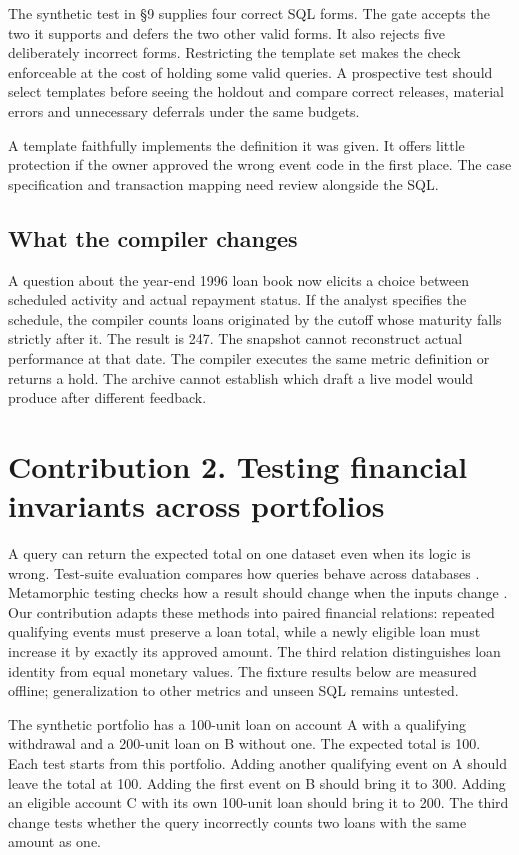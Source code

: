 \documentclass[11pt,a4paper,onecolumn,oneside]{rho-class/rho}
\begin{document}
The synthetic test in \S{}9 supplies four correct SQL forms. The gate accepts the two it supports and defers the two other valid forms. It also rejects five deliberately incorrect forms. Restricting the template set makes the check enforceable at the cost of holding some valid queries. A prospective test should select templates before seeing the holdout and compare correct releases, material errors and unnecessary deferrals under the same budgets.

A template faithfully implements the definition it was given. It offers little protection if the owner approved the wrong event code in the first place. The case specification and transaction mapping need review alongside the SQL.

\subsection{What the compiler changes}
A question about the year-end 1996 loan book now elicits a choice between scheduled activity and actual repayment status. If the analyst specifies the schedule, the compiler counts loans originated by the cutoff whose maturity falls strictly after it. The result is 247. The snapshot cannot reconstruct actual performance at that date. The compiler executes the same metric definition or returns a hold. The archive cannot establish which draft a live model would produce after different feedback.

\clearpage

\section{Contribution 2. Testing financial invariants across portfolios}

\label{sec:s9}

A query can return the expected total on one dataset even when its logic is wrong. Test-suite evaluation compares how queries behave across databases \citep{zhong}. Metamorphic testing checks how a result should change when the inputs change \citep{metamorphic}. Our contribution adapts these methods into paired financial relations: repeated qualifying events must preserve a loan total, while a newly eligible loan must increase it by exactly its approved amount. The third relation distinguishes loan identity from equal monetary values. The fixture results below are measured offline; generalization to other metrics and unseen SQL remains untested.

The synthetic portfolio has a 100-unit loan on account A with a qualifying withdrawal and a 200-unit loan on B without one. The expected total is 100. Each test starts from this portfolio. Adding another qualifying event on A should leave the total at 100. Adding the first event on B should bring it to 300. Adding an eligible account C with its own 100-unit loan should bring it to 200. The third change tests whether the query incorrectly counts two loans with the same amount as one.
\end{document}
